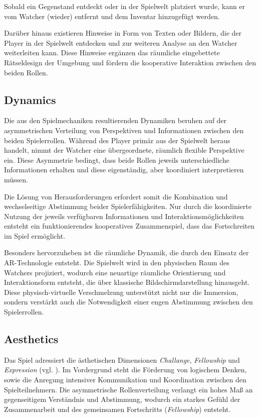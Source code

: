 Sobald ein Gegenstand entdeckt oder in der Spielwelt platziert wurde, kann er vom Watcher (wieder) entfernt und dem Inventar hinzugefügt werden.

Darüber hinaus existieren Hinweise in Form von Texten oder Bildern, die der Player in der Spielwelt entdecken und zur weiteren Analyse an den Watcher weiterleiten kann. Diese Hinweise ergänzen das räumliche eingebettete Rätseldesign der Umgebung und fördern die kooperative Interaktion zwischen den beiden Rollen.

\subsection{Dynamics}

Die aus den Spielmechaniken resultierenden Dynamiken beruhen auf der asymmetrischen Verteilung von Perspektiven und Informationen zwischen den beiden Spielerrollen. Während des Player primär aus der Spielwelt heraus handelt, nimmt der Watcher eine übergeordnete, räumlich flexible Perspektive ein. Diese Asymmetrie bedingt, dass beide Rollen jeweils unterschiedliche Informationen erhalten und diese eigenständig, aber koordiniert interpretieren müssen.

Die Lösung von Herausforderungen erfordert somit die Kombination und wechselseitige Abstimmung beider Spielerfähigkeiten. Nur durch die koordinierte Nutzung der jeweils verfügbaren Informationen und Interaktionsmöglichkeiten entsteht ein funktionierendes kooperatives Zusammenspiel, dass das Fortschreiten im Spiel ermöglicht.

Besonders hervorzuheben ist die räumliche Dynamik, die durch den Einsatz der \ac{AR}-Technologie entsteht. Die Spielwelt wird in den physischen Raum des Watchers projiziert, wodurch eine neuartige räumliche Orientierung und Interaktionsform entsteht, die über klassische Bildschirmdarstellung hinausgeht. Diese physisch-virtuelle Verschmelzung unterstützt nicht nur die Immersion, sondern verstärkt auch die Notwendigkeit einer engen Abstimmung zwischen den Spielerrollen.

\subsection{Aesthetics}

Das Spiel adressiert die ästhetischen Dimensionen \textit{Challange}, \textit{Fellowship} und \textit{Expression} (vgl. \citealp[S. 3]{hunicke_mda_2004}). Im Vordergrund steht die Förderung von logischem Denken, sowie die Anregung intensiver Kommunikation und Koordination zwischen den Spielteilnehmern. Die asymmetrische Rollenverteilung verlangt ein hohes Maß an gegenseitigem Verständnis und Abstimmung, wodurch ein starkes Gefühl der Zusammenarbeit und des gemeinsamen Fortschritts (\textit{Fellowship}) entsteht.

